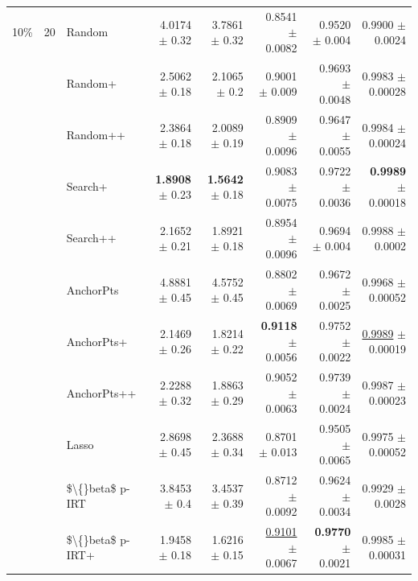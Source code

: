 \begin{longtable}{llp{}rrrrr}
\midrule
10\% & 20 & Random & 4.0174 {\scriptsize $\pm$ 0.32} & 3.7861 {\scriptsize $\pm$ 0.32} & 0.8541 {\scriptsize $\pm$ 0.0082} & 0.9520 {\scriptsize $\pm$ 0.004} & 0.9900 {\scriptsize $\pm$ 0.0024} \\
 &  & Random+ & 2.5062 {\scriptsize $\pm$ 0.18} & 2.1065 {\scriptsize $\pm$ 0.2} & 0.9001 {\scriptsize $\pm$ 0.009} & 0.9693 {\scriptsize $\pm$ 0.0048} & 0.9983 {\scriptsize $\pm$ 0.00028} \\
 &  & Random++ & 2.3864 {\scriptsize $\pm$ 0.18} & 2.0089 {\scriptsize $\pm$ 0.19} & 0.8909 {\scriptsize $\pm$ 0.0096} & 0.9647 {\scriptsize $\pm$ 0.0055} & 0.9984 {\scriptsize $\pm$ 0.00024} \\
 &  & Search+ & \textbf{1.8908} {\scriptsize $\pm$ 0.23} & \textbf{1.5642} {\scriptsize $\pm$ 0.18} & 0.9083 {\scriptsize $\pm$ 0.0075} & 0.9722 {\scriptsize $\pm$ 0.0036} & \textbf{0.9989} {\scriptsize $\pm$ 0.00018} \\
 &  & Search++ & 2.1652 {\scriptsize $\pm$ 0.21} & 1.8921 {\scriptsize $\pm$ 0.18} & 0.8954 {\scriptsize $\pm$ 0.0096} & 0.9694 {\scriptsize $\pm$ 0.004} & 0.9988 {\scriptsize $\pm$ 0.0002} \\
 &  & AnchorPts & 4.8881 {\scriptsize $\pm$ 0.45} & 4.5752 {\scriptsize $\pm$ 0.45} & 0.8802 {\scriptsize $\pm$ 0.0069} & 0.9672 {\scriptsize $\pm$ 0.0025} & 0.9968 {\scriptsize $\pm$ 0.00052} \\
 &  & AnchorPts+ & 2.1469 {\scriptsize $\pm$ 0.26} & 1.8214 {\scriptsize $\pm$ 0.22} & \textbf{0.9118} {\scriptsize $\pm$ 0.0056} & 0.9752 {\scriptsize $\pm$ 0.0022} & \underline{0.9989} {\scriptsize $\pm$ 0.00019} \\
 &  & AnchorPts++ & 2.2288 {\scriptsize $\pm$ 0.32} & 1.8863 {\scriptsize $\pm$ 0.29} & 0.9052 {\scriptsize $\pm$ 0.0063} & 0.9739 {\scriptsize $\pm$ 0.0024} & 0.9987 {\scriptsize $\pm$ 0.00023} \\
 &  & Lasso & 2.8698 {\scriptsize $\pm$ 0.45} & 2.3688 {\scriptsize $\pm$ 0.34} & 0.8701 {\scriptsize $\pm$ 0.013} & 0.9505 {\scriptsize $\pm$ 0.0065} & 0.9975 {\scriptsize $\pm$ 0.00052} \\
 &  & \$\textbackslash\{\}beta\$ p-IRT & 3.8453 {\scriptsize $\pm$ 0.4} & 3.4537 {\scriptsize $\pm$ 0.39} & 0.8712 {\scriptsize $\pm$ 0.0092} & 0.9624 {\scriptsize $\pm$ 0.0034} & 0.9929 {\scriptsize $\pm$ 0.0028} \\
 &  & \$\textbackslash\{\}beta\$ p-IRT+ & 1.9458 {\scriptsize $\pm$ 0.18} & 1.6216 {\scriptsize $\pm$ 0.15} & \underline{0.9101} {\scriptsize $\pm$ 0.0067} & \textbf{0.9770} {\scriptsize $\pm$ 0.0021} & 0.9985 {\scriptsize $\pm$ 0.00031} \\

\end{longtable}
